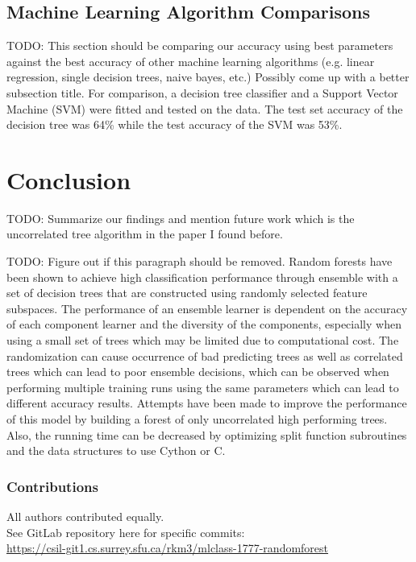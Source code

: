 \documentclass{article} %
\begin{document}
\subsection{Machine Learning Algorithm Comparisons}
TODO:  This section should be comparing our accuracy using best parameters against the best accuracy of other machine learning algorithms (e.g. linear regression, single decision trees, naive bayes, etc.)  Possibly come up with a better subsection title.
For comparison, a decision tree classifier and a Support Vector Machine (SVM) were fitted and tested on the data. The test set accuracy of the decision tree was 64\% while the test accuracy
of the SVM was 53\%. 

\section{Conclusion}
TODO: Summarize our findings and mention future work which is the uncorrelated tree algorithm in the paper I found before.

TODO: Figure out if this paragraph should be removed.
Random forests have been shown to achieve high classification performance through ensemble with a set of decision trees that are constructed using randomly selected feature subspaces. The performance of an ensemble learner is dependent on the accuracy of each component learner and the diversity of the components, especially when using a small set of trees which may be limited due to computational cost. The randomization can cause occurrence of bad predicting trees as well as correlated trees which can lead to poor ensemble decisions, which can be observed when performing multiple training runs using the same parameters which can lead to different accuracy results. Attempts have been made to improve the performance of this model by building a forest of only uncorrelated high performing trees. \cite{Bharathidason2014}
Also, the running time can be decreased by optimizing split function subroutines and the data structures to use Cython or C. 

\subsubsection*{Contributions}
All authors contributed equally.\\
See GitLab repository here for specific commits:\\
\href{
    https://csil-git1.cs.surrey.sfu.ca/rkm3/mlclass-1777-randomforest
}{
    https://csil-git1.cs.surrey.sfu.ca/rkm3/mlclass-1777-randomforest
}


\small{


}
\end{document}
